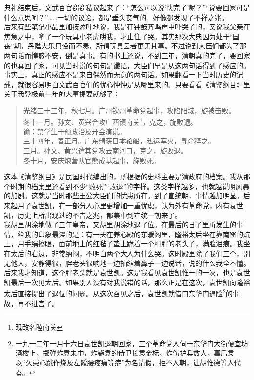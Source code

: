 典礼结束后，文武百官窃窃私议起来了：“怎么可以说‘快完了’呢？”“说要回家可是什么意思呵？”……一切的议论，都是垂头丧气的，好像都发现了不祥之兆。\\

后来有些笔记小品里加技添叶地说，我是在钟鼓齐鸣声中吓哭了的，又说我父亲在焦急之中，拿了一个玩具小老虎哄我，才止住了哭。其实那次大典因为处于“国丧”期，丹陛大乐只设而不奏，所谓玩具云者更无其事。不过说到大臣们都为了那两句话而惶惑不安，倒是真事。有的书上还说，不到三年，清朝真的完了，要回家的也真回了家，可见当时说的句句是谶语，大臣们早是从这两句话得到了感应的。\\

事实上，真正的感应不是来自偶然而无意的两句话。如果翻看一下当时历史的记载，就很容易明白文武百官们的忧心忡忡是从哪里来的。只要看看《清鉴纲目》里关于我登极前一年的大事提要就够了：\\

\begin{quote}
	光绪三十三年，秋七月。广州钦州革命党起事，攻陷阳城，旋被击败。\\

冬十一月。孙文、黄兴合攻广西镇南关\footnote{现改名睦南关}，克之，旋败退。\\

谕：禁学生干预政治及开会演说。\\

三十四年，春正月。广东缉获日本轮船，私运军火，寻命释之。\\

三月。孙文、黄兴遣其党攻云南河口，克之，旋败退。\\

冬十月，安庆炮营队官熊成基起事，旋败死。\\
\end{quote}

这本《清鉴纲目》是民国时代编出的，所根据的史料主要是清政府的档案。我从那个时期的档案里还看到不少“败死”“败退”的字样。这类字样越多，也就越说明风暴的加剧。这就是当时那些王公大臣们的忧患所在。到了宣统朝，事情越加明显。后来起用了袁世凯，在一部分人心里更增加一重忧虑，认为外有革命党，内有袁世凯，历史上所出现过的不吉之兆，都集中到宣统一朝来了。\\

我胡里胡涂地做了三年皇帝，又胡里胡涂地退了位。在最后的日子里所发生的事情，给我的印象最深的是：有一天在养心殿的东暖阁里，隆裕太后坐在靠南窗的炕上，用手绢擦眼，面前地上的红毡子垫上跪着一个粗胖的老头子，满脸泪痕。我坐在太后的右边，非常纳闷，不明白两个大人为什么哭。这时殿里除了我们三个，别无他人，安静得很，胖老头很响地一边抽缩着鼻子一边说话，说的什么我全不懂。后来我才知道，这个胖老头就是袁世凯。这是我看见袁世凯惟一的一次，也是袁世凯最后一次见太后。如果别人没有对我说错的话，那么正是在这次，袁世凯向隆裕太后直接提出了退位的问题。从这次召见之后，袁世凯就借口东华门遇险\footnote{一九一二年一月十六日袁世凯退朝回家，三个革命党人伺于东华门大街便宜坊酒楼上，掷弹炸袁未中，炸毙袁的侍卫长袁金标，炸伤护兵数人，事后袁以“久患心跳作烧及左骽腰疼痛等症”为名请假，拒不入朝，让胡惟德等人代奏。}的事故，再不进宫了。\\

